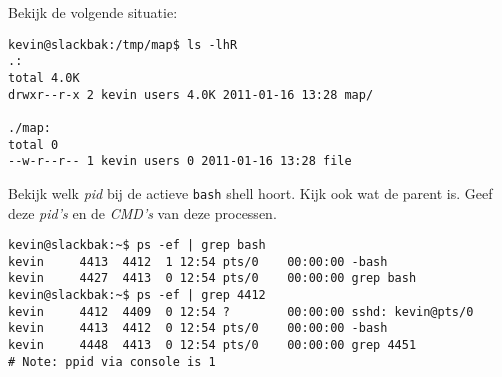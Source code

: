 \question[0] Bekijk de volgende situatie:
\begin{lstlisting}
kevin@slackbak:/tmp/map$ ls -lhR
.:
total 4.0K
drwxr--r-x 2 kevin users 4.0K 2011-01-16 13:28 map/

./map:
total 0
--w-r--r-- 1 kevin users 0 2011-01-16 13:28 file
\end{lstlisting}%

\question[10] Bekijk welk \emph{pid} bij de actieve \texttt{bash} shell hoort. Kijk ook wat de parent is. Geef deze \emph{pid's} en de \emph{CMD's} van deze processen.
\begin{solution}
\begin{lstlisting}
kevin@slackbak:~$ ps -ef | grep bash
kevin     4413  4412  1 12:54 pts/0    00:00:00 -bash
kevin     4427  4413  0 12:54 pts/0    00:00:00 grep bash
kevin@slackbak:~$ ps -ef | grep 4412
kevin     4412  4409  0 12:54 ?        00:00:00 sshd: kevin@pts/0
kevin     4413  4412  0 12:54 pts/0    00:00:00 -bash
kevin     4448  4413  0 12:54 pts/0    00:00:00 grep 4451
# Note: ppid via console is 1
\end{lstlisting}
\end{solution}

